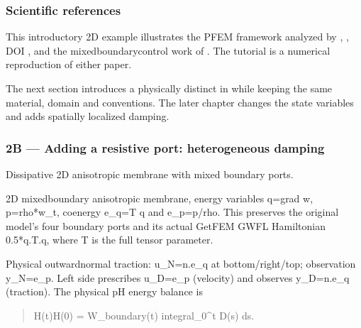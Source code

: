 \documentclass[letterpaper,10pt,english]{sphinxmanual}
\begin{document}
\subsubsection{Scientific references}
\label{\detokenize{examples/wave:scientific-references}}
\sphinxAtStartPar
This introductory 2D example illustrates the
PFEM framework analyzed by , , DOI , and
the mixed\sphinxhyphen{}boundary\sphinxhyphen{}control work of . The tutorial is
 a numerical reproduction of either paper.

\sphinxAtStartPar
The next section introduces a physically distinct
 in 
while keeping the same material, domain and
conventions. The later {\hyperref[\detokenize{examples/wave_coenergy::doc}]{}}
chapter changes the state variables and adds
spatially localized damping.


\subsubsection{2B — Adding a resistive port: heterogeneous damping}
\label{\detokenize{examples/wave:module-examples.wave_dissipative}}\label{\detokenize{examples/wave:b-adding-a-resistive-port-heterogeneous-damping}}
\sphinxAtStartPar
Dissipative 2D anisotropic membrane with mixed boundary ports.

\sphinxAtStartPar
2D mixed\sphinxhyphen{}boundary anisotropic membrane, energy variables q=grad w,
p=rho*w\_t, coenergy e\_q=T q and e\_p=p/rho. This preserves the
original model’s four boundary ports and its actual GetFEM GWFL
Hamiltonian 0.5*q.T.q, where T is the full tensor parameter.

\sphinxAtStartPar
Physical outward\sphinxhyphen{}normal traction: u\_N=n.e\_q at bottom/right/top;
observation y\_N=e\_p. Left side prescribes u\_D=e\_p (velocity) and
observes y\_D=n.e\_q (traction). The physical pH energy balance is
\begin{quote}

\sphinxAtStartPar
H(t)\sphinxhyphen{}H(0) = W\_boundary(t) \sphinxhyphen{} integral\_0\textasciicircum{}t D(s) ds.
\end{quote}
\end{document}
